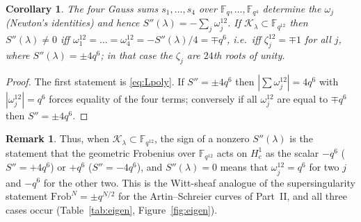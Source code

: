 \documentclass[12pt,a4paper]{amsart}
\newtheorem{corollary}[theorem]{Corollary}
\theoremstyle{definition}
\newtheorem{remark}[theorem]{Remark}
\newcommand{\F}{\mathbb{F}}
\newcommand{\Kk}{\mathcal{K}}
\newcommand{\Spp}{S''}
\begin{document}
\begin{corollary}\label{cor:Lprinciple}
The four Gauss sums $s_1,\dots,s_4$ over $\F_q,\dots,\F_{q^4}$ determine the $\omega_j$ (Newton's identities) and hence $\Spp(\lambda)=-\sum_j\omega_j^{12}$. If $\Kk_\lambda\subset\F_{q^{12}}$ then $\Spp(\lambda)\ne0$ iff $\omega_1^{12}=\dots=\omega_4^{12}=-\Spp(\lambda)/4=\mp q^6$, i.e.\ iff $\zeta_j^{12}=\mp1$ for all $j$, where $\Spp(\lambda)=\pm4q^6$; in that case the $\zeta_j$ are $24$th roots of unity.
\end{corollary}
\begin{proof}
The first statement is \eqref{eq:Lpoly}. If $\Spp=\pm4q^6$ then $|\sum\omega_j^{12}|=4q^6$ with $|\omega_j^{12}|=q^6$ forces equality of the four terms; conversely if all $\omega_j^{12}$ are equal to $\mp q^6$ then $\Spp=\pm4q^6$.
\end{proof}

\begin{remark}
Thus, when $\Kk_\lambda\subset\F_{q^{12}}$, the sign of a nonzero $\Spp(\lambda)$ is the statement that the geometric Frobenius over $\F_{q^{12}}$ acts on $H^1_c$ as the scalar $-q^6$ ($\Spp=+4q^6$) or $+q^6$ ($\Spp=-4q^6$), and $\Spp(\lambda)=0$ means that $\omega_j^{12}=q^6$ for two $j$ and $-q^6$ for the other two. This is the Witt-sheaf analogue of the supersingularity statement $\mathrm{Frob}^{N}=\pm q^{N/2}$ for the Artin--Schreier curves of Part~II, and all three cases occur (Table~\ref{tab:eigen}, Figure~\ref{fig:eigen}).
\end{remark}
\end{document}
